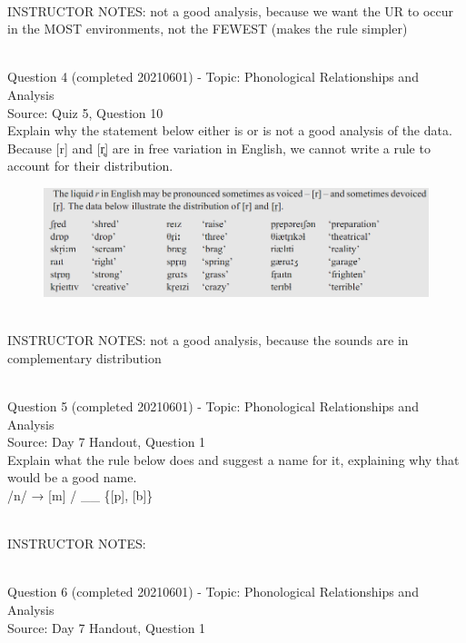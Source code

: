\documentclass[12pt]{article}
\begin{document}
~\\
INSTRUCTOR NOTES: not a good analysis, because we want the UR to occur in the MOST environments, not the FEWEST (makes the rule simpler)


~\\

{\large Question 4} (completed 20210601) - Topic: Phonological Relationships and Analysis\\
Source: Quiz 5, Question 10\\

Explain why the statement below either is or is not a good analysis of the data.\\

Because {[r]} and {[r̥]} are in free variation in English, we cannot write a rule to account for their distribution.

\begin{figure}[H]
\includegraphics{../images/peng71_englishr.png}
\end{figure}

~\\
INSTRUCTOR NOTES: not a good analysis, because the sounds are in complementary distribution


~\\

{\large Question 5} (completed 20210601) - Topic: Phonological Relationships and Analysis\\
Source: Day 7 Handout, Question 1\\

Explain what the rule below does and suggest a name for it, explaining why that would be a good name.\\

/n/ → {[m]} / \_\_ \{{[p]}, {[b]}\}


~\\
INSTRUCTOR NOTES: 


~\\

{\large Question 6} (completed 20210601) - Topic: Phonological Relationships and Analysis\\
Source: Day 7 Handout, Question 1\\
\end{document}
